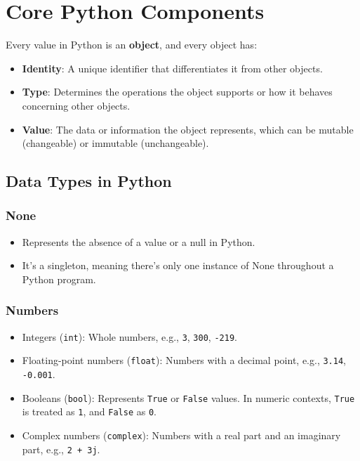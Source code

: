 \documentclass{article}
\begin{document}
\section{Core Python Components}

Every value in Python is an \textbf{object}, and every object has:
\begin{itemize}
    \item \textbf{Identity}: A unique identifier that differentiates it from other objects.
    \item \textbf{Type}: Determines the operations the object supports or how it behaves concerning other objects.
    \item \textbf{Value}: The data or information the object represents, which can be mutable (changeable) or immutable (unchangeable).
\end{itemize}

\subsection{Data Types in Python}

\subsubsection{None}

\begin{itemize}
    \item Represents the absence of a value or a null in Python.
    \item It's a singleton, meaning there's only one instance of None throughout a Python program.
\end{itemize}

\subsubsection{Numbers}

\begin{itemize}
    \item Integers (\texttt{int}): Whole numbers, e.g., \texttt{3}, \texttt{300}, \texttt{-219}.
    \item Floating-point numbers (\texttt{float}): Numbers with a decimal point, e.g., \texttt{3.14}, \texttt{-0.001}.
    \item Booleans (\texttt{bool}): Represents \texttt{True} or \texttt{False} values. In numeric contexts, \texttt{True} is treated as \texttt{1}, and \texttt{False} as \texttt{0}.
    \item Complex numbers (\texttt{complex}): Numbers with a real part and an imaginary part, e.g., \texttt{2 + 3j}.
\end{itemize}
\end{document}

